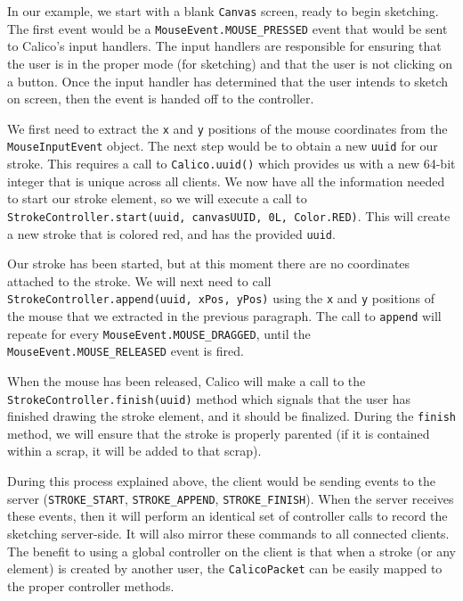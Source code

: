 In our example, we start with a blank \texttt{Canvas} screen, ready to begin sketching. The first event would be a \texttt{MouseEvent.MOUSE\_PRESSED} event that would be sent to Calico's input handlers. The input handlers are responsible for ensuring that the user is in the proper mode (for sketching) and that the user is not clicking on a button. Once the input handler has determined that the user intends to sketch on screen, then the event is handed off to the controller.

We first need to extract the \texttt{x} and \texttt{y} positions of the mouse coordinates from the \texttt{MouseInputEvent} object. The next step would be to obtain a new \texttt{uuid} for our stroke. This requires a call to \texttt{Calico.uuid()} which provides us with a new 64-bit integer that is unique across all clients. We now have all the information needed to start our stroke element, so we will execute a call to \texttt{StrokeController.start(uuid, canvasUUID, 0L, Color.RED)}. This will create a new stroke that is colored red, and has the provided \texttt{uuid}. 

Our stroke has been started, but at this moment there are no coordinates attached to the stroke. We will next need to call \texttt{StrokeController.append(uuid, xPos, yPos)} using the \texttt{x} and \texttt{y} positions of the mouse that we extracted in the previous paragraph. The call to \texttt{append} will repeate for every \texttt{MouseEvent.MOUSE\_DRAGGED}, until the \texttt{MouseEvent.MOUSE\_RELEASED} event is fired.

When the mouse has been released, Calico will make a call to the \texttt{StrokeController.finish(uuid)} method which signals that the user has finished drawing the stroke element, and it should be finalized. During the \texttt{finish} method, we will ensure that the stroke is properly parented (if it is contained within a scrap, it will be added to that scrap).

During this process explained above, the client would be sending events to the server (\texttt{STROKE\_START}, \texttt{STROKE\_APPEND}, \texttt{STROKE\_FINISH}). When the server receives these events, then it will perform an identical set of controller calls to record the sketching server-side. It will also mirror these commands to all connected clients. The benefit to using a global controller on the client is that when a stroke (or any element) is created by another user, the \texttt{CalicoPacket} can be easily mapped to the proper controller methods.